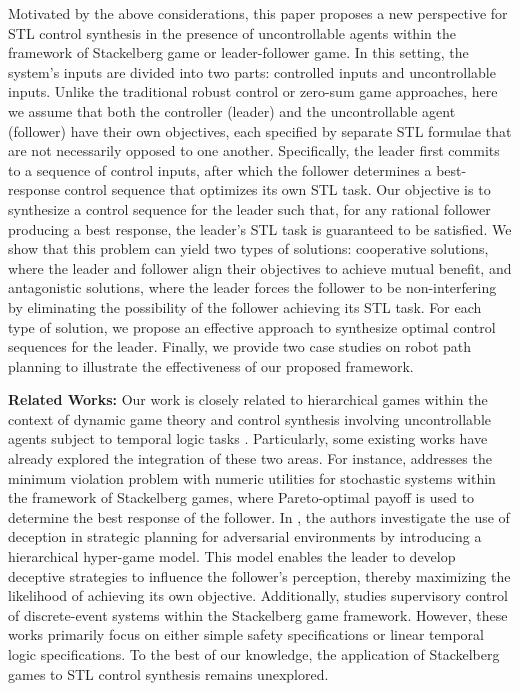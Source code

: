 \documentclass[letterpaper, 10 pt, conference]{ieeeconf}
\begin{document}
Motivated by the above considerations, this paper proposes a new perspective for STL control synthesis in the presence of uncontrollable agents within the framework of Stackelberg game or leader-follower game. In this setting, the system's inputs are divided into two parts: 
controlled inputs and uncontrollable inputs. Unlike the traditional robust control or zero-sum game approaches, here we assume that both the controller (leader) and the uncontrollable agent (follower) have their own objectives, each specified by separate STL formulae that are not necessarily opposed to one another. Specifically, the leader first commits to a sequence of control inputs, after which the follower determines a best-response control sequence that optimizes its own STL task. Our objective is to synthesize a control sequence for the leader such that, for any rational follower producing a best response, the leader's STL task is guaranteed to be satisfied. We show that this problem can yield two types of solutions: cooperative solutions, where the leader and follower align their objectives to achieve mutual benefit, and antagonistic solutions, where  the leader forces the follower to be non-interfering by eliminating the possibility of the follower achieving its STL task. For each type of solution, we propose an effective approach to synthesize optimal control sequences for the leader. Finally, we provide two case studies on robot path planning to illustrate the effectiveness  of our proposed framework.

\textbf{Related Works: }
Our work is closely related to hierarchical games within the context of dynamic game theory \cite{bacsar1998dynamic, zhu2011stackelberg} and control synthesis involving uncontrollable agents subject to temporal logic tasks \cite{ulusoy2014receding, hoxha2016planning, li2021safe}. Particularly, some existing works have already explored the integration of these two areas. For instance, \cite{niu2020optimal} addresses the minimum violation problem with numeric utilities for stochastic systems within the framework of Stackelberg games, where  Pareto-optimal payoff is used to determine the best response of the follower. In \cite{li2022dynamic}, the authors investigate the use of deception in strategic planning for adversarial environments by introducing a hierarchical hyper-game model. This model enables the leader to develop deceptive strategies to influence the follower's perception, thereby maximizing the likelihood of achieving its own objective. Additionally, \cite{cui2023towards} studies supervisory control of discrete-event systems within the Stackelberg game framework. However, these works primarily focus on either simple safety specifications or linear temporal logic specifications. To the best of our knowledge, the application of Stackelberg games to STL control synthesis remains unexplored.
\end{document}

